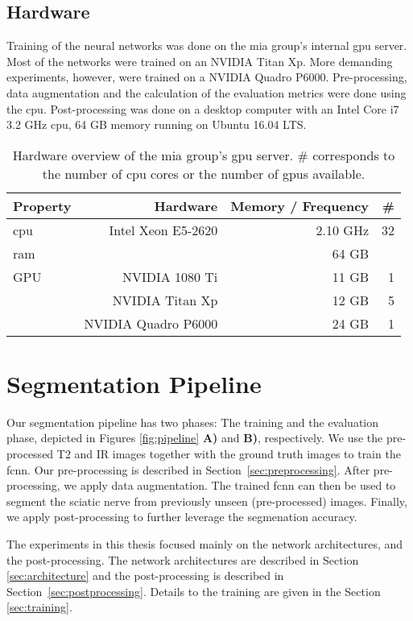 \subsection{Hardware}
Training of the neural networks was done on the \gls{mia} group's internal \gls{gpu} server. Most of the networks were trained on an NVIDIA Titan Xp. More demanding experiments, however, were trained on a NVIDIA Quadro P6000. Pre-processing, data augmentation and the calculation of the evaluation metrics were done using the \gls{cpu}. Post-processing was done on a desktop computer with an Intel Core i7 3.2 GHz \gls{cpu}, 64 GB memory running on Ubuntu 16.04 LTS.
\begin{table}[htbp]
   \centering
   \caption[Hardware]{Hardware overview of the \gls{mia} group's \gls{gpu} server. \# corresponds to the number of \gls{cpu} cores or the number of \gls{gpu}s available.}
   \begin{tabular}{l*{3}{r}}
      \toprule
      Property & Hardware & Memory / Frequency & \# \\
      \midrule
      \acrshort{cpu} & Intel Xeon E5-2620 & 2.10 GHz & 32 \\
      \acrshort{ram} & & 64 GB & \\
      GPU & NVIDIA 1080 Ti & 11 GB & 1 \\
       & NVIDIA Titan Xp & 12 GB & 5 \\
       & NVIDIA Quadro P6000 & 24 GB & 1 \\
      \bottomrule
   \end{tabular}
   \label{tab:cluster}
\end{table}

\section{Segmentation Pipeline}
Our segmentation pipeline has two phases: The training and the evaluation phase, depicted in Figures \ref{fig:pipeline} \textbf{A)} and \textbf{B)}, respectively. We use the pre-processed T2 and IR images together with the ground truth images to train the \gls{fcnn}. Our pre-processing is described in Section~\ref{sec:preprocessing}. After pre-processing, we apply data augmentation. The trained \gls{fcnn} can then be used to segment the sciatic nerve from previously unseen (pre-processed) images. Finally, we apply post-processing to further leverage the segmenation accuracy.

The experiments in this thesis focused mainly on the network architectures, and the post-processing. The network architectures are described in Section \ref{sec:architecture} and the post-processing is described in Section~\ref{sec:postprocessing}. Details to the training are given in the Section \ref{sec:training}.

